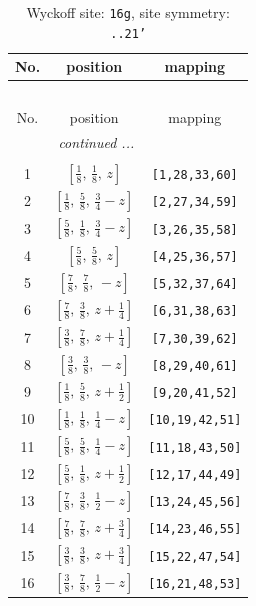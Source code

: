 \documentclass[fleqn,8pt]{jsarticle}
\begin{document}
\renewcommand{\arraystretch}{1.2}
\begin{longtable}{ccc}
\caption{Wyckoff site: {\tt 16g}, site symmetry: {\tt ..21'}}
 \\
 \hline \hline
No. & position & mapping \\ \hline \endfirsthead

\multicolumn{2}{l}{\tablename\ \thetable{}} \\
 \hline \hline
No. & position & mapping \\ \hline \endhead

 \hline \hline
\multicolumn{2}{r}{\footnotesize\it continued ...} \\ \endfoot

 \hline \hline
\multicolumn{2}{r}{} \\ \endlastfoot

1 & $\left[ \frac{1}{8},\, \frac{1}{8},\, z \right]$ & {\tt [1,28,33,60]} \\ \hline
2 & $\left[ \frac{1}{8},\, \frac{5}{8},\, \frac{3}{4} - z \right]$ & {\tt [2,27,34,59]} \\ \hline
3 & $\left[ \frac{5}{8},\, \frac{1}{8},\, \frac{3}{4} - z \right]$ & {\tt [3,26,35,58]} \\ \hline
4 & $\left[ \frac{5}{8},\, \frac{5}{8},\, z \right]$ & {\tt [4,25,36,57]} \\ \hline
5 & $\left[ \frac{7}{8},\, \frac{7}{8},\, - z \right]$ & {\tt [5,32,37,64]} \\ \hline
6 & $\left[ \frac{7}{8},\, \frac{3}{8},\, z + \frac{1}{4} \right]$ & {\tt [6,31,38,63]} \\ \hline
7 & $\left[ \frac{3}{8},\, \frac{7}{8},\, z + \frac{1}{4} \right]$ & {\tt [7,30,39,62]} \\ \hline
8 & $\left[ \frac{3}{8},\, \frac{3}{8},\, - z \right]$ & {\tt [8,29,40,61]} \\ \hline
9 & $\left[ \frac{1}{8},\, \frac{5}{8},\, z + \frac{1}{2} \right]$ & {\tt [9,20,41,52]} \\ \hline
10 & $\left[ \frac{1}{8},\, \frac{1}{8},\, \frac{1}{4} - z \right]$ & {\tt [10,19,42,51]} \\ \hline
11 & $\left[ \frac{5}{8},\, \frac{5}{8},\, \frac{1}{4} - z \right]$ & {\tt [11,18,43,50]} \\ \hline
12 & $\left[ \frac{5}{8},\, \frac{1}{8},\, z + \frac{1}{2} \right]$ & {\tt [12,17,44,49]} \\ \hline
13 & $\left[ \frac{7}{8},\, \frac{3}{8},\, \frac{1}{2} - z \right]$ & {\tt [13,24,45,56]} \\ \hline
14 & $\left[ \frac{7}{8},\, \frac{7}{8},\, z + \frac{3}{4} \right]$ & {\tt [14,23,46,55]} \\ \hline
15 & $\left[ \frac{3}{8},\, \frac{3}{8},\, z + \frac{3}{4} \right]$ & {\tt [15,22,47,54]} \\ \hline
16 & $\left[ \frac{3}{8},\, \frac{7}{8},\, \frac{1}{2} - z \right]$ & {\tt [16,21,48,53]} \\
\end{longtable}
\end{document}

